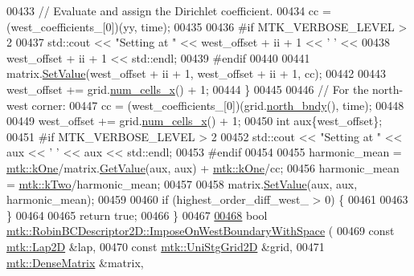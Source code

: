 \begin{DoxyCode}
00433     \textcolor{comment}{// Evaluate and assign the Dirichlet coefficient.}
00434     cc = (west\_coefficients\_[0])(yy, time);
00435 
00436 \textcolor{preprocessor}{    #if MTK\_VERBOSE\_LEVEL > 2}
00437     std::cout << \textcolor{stringliteral}{"Setting at "} << west\_offset + ii + 1 << \textcolor{charliteral}{' '} <<
00438       west\_offset + ii + 1 << std::endl;
00439 \textcolor{preprocessor}{    #endif}
00440 
00441     matrix.\hyperlink{classmtk_1_1DenseMatrix_a784ce5784109ac86bfb9d8562b334b13}{SetValue}(west\_offset + ii + 1, west\_offset + ii + 1, cc);
00442 
00443     west\_offset += grid.\hyperlink{classmtk_1_1UniStgGrid2D_a2d182866a398aba8e4829590e85bf939}{num\_cells\_x}() + 1;
00444   \}
00445 
00446   \textcolor{comment}{// For the north-west corner:}
00447   cc = (west\_coefficients\_[0])(grid.\hyperlink{classmtk_1_1UniStgGrid2D_afe1ead253cdeb5503e0489eba8fd84e2}{north\_bndy}(), time);
00448 
00449   west\_offset += grid.\hyperlink{classmtk_1_1UniStgGrid2D_a2d182866a398aba8e4829590e85bf939}{num\_cells\_x}() + 1;
00450   \textcolor{keywordtype}{int} aux\{west\_offset\};
00451 \textcolor{preprocessor}{  #if MTK\_VERBOSE\_LEVEL > 2}
00452   std::cout << \textcolor{stringliteral}{"Setting at "} << aux << \textcolor{charliteral}{' '} << aux << std::endl;
00453 \textcolor{preprocessor}{  #endif}
00454 
00455   harmonic\_mean = \hyperlink{group__c01-roots_ga26407c24d43b6b95480943340d285c71}{mtk::kOne}/matrix.\hyperlink{classmtk_1_1DenseMatrix_a4b23ecbebd970b5eea915dbb50691024}{GetValue}(aux, aux) + 
      \hyperlink{group__c01-roots_ga26407c24d43b6b95480943340d285c71}{mtk::kOne}/cc;
00456   harmonic\_mean = \hyperlink{group__c01-roots_gaf39c2d851a2db744f4feb1c5ab3ec2cf}{mtk::kTwo}/harmonic\_mean;
00457 
00458   matrix.\hyperlink{classmtk_1_1DenseMatrix_a784ce5784109ac86bfb9d8562b334b13}{SetValue}(aux, aux, harmonic\_mean);
00459 
00460   \textcolor{keywordflow}{if} (highest\_order\_diff\_west\_ > 0) \{
00461 
00463   \}
00464 
00465   \textcolor{keywordflow}{return} \textcolor{keyword}{true};
00466 \}
00467 
\hypertarget{mtk__robin__bc__descriptor__2d_8cc_source_l00468}{}\hyperlink{classmtk_1_1RobinBCDescriptor2D_adbfdfa9c6b93df8d23c50686b5b356ef}{00468} \textcolor{keywordtype}{bool} \hyperlink{classmtk_1_1RobinBCDescriptor2D_adbfdfa9c6b93df8d23c50686b5b356ef}{mtk::RobinBCDescriptor2D::ImposeOnWestBoundaryWithSpace}
      (
00469     \textcolor{keyword}{const} \hyperlink{classmtk_1_1Lap2D}{mtk::Lap2D} &lap,
00470     \textcolor{keyword}{const} \hyperlink{classmtk_1_1UniStgGrid2D}{mtk::UniStgGrid2D} &grid,
00471     \hyperlink{classmtk_1_1DenseMatrix}{mtk::DenseMatrix} &matrix,

\end{DoxyCode}
